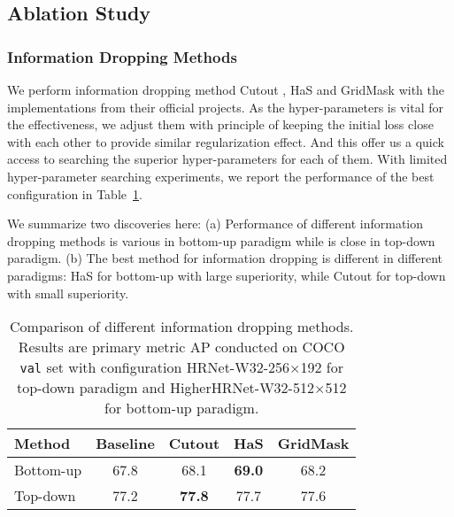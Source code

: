 \documentclass[final]{cvpr}
\begin{document}
\subsection{Ablation Study}
\label{sec:ablation}


\subsubsection{Information Dropping Methods}
We perform information dropping method Cutout \cite{Cutout}, HaS \cite{HaS} and GridMask \cite{GridMask} with the implementations from their official projects. As the hyper-parameters is vital for the effectiveness, we adjust them with principle of keeping the initial loss close with each other to provide similar regularization effect. And this offer us a quick access to searching the superior hyper-parameters for each of them. With limited hyper-parameter searching experiments, we report the performance of the best configuration in Table~\ref{tab:diffid}.

We summarize two discoveries here: (a) Performance of different information dropping methods is various in bottom-up paradigm while is close in top-down paradigm. (b) The best method for information dropping is different in different paradigms: HaS for bottom-up with large superiority, while Cutout for top-down with small superiority.

\begin{table}[h]
\footnotesize
\begin{center}
\begin{tabular}{l|c|c|c|c}

\hline
Method     & Baseline    &Cutout        &HaS            &GridMask        \\
\hline
Bottom-up  & 67.8        &68.1          &\textbf{69.0}  &68.2           \\
Top-down   & 77.2        &\textbf{77.8} &77.7           &77.6           \\
\hline
\end{tabular}
\end{center}
\caption{Comparison of different information dropping methods. Results are primary metric AP conducted on COCO \texttt{val} set with configuration HRNet-W32-256$\times$192 for top-down paradigm and HigherHRNet-W32-512$\times$512 for bottom-up paradigm.}
\label{tab:diffid}
\end{table}
\vspace{-0.3cm}
\end{document}
